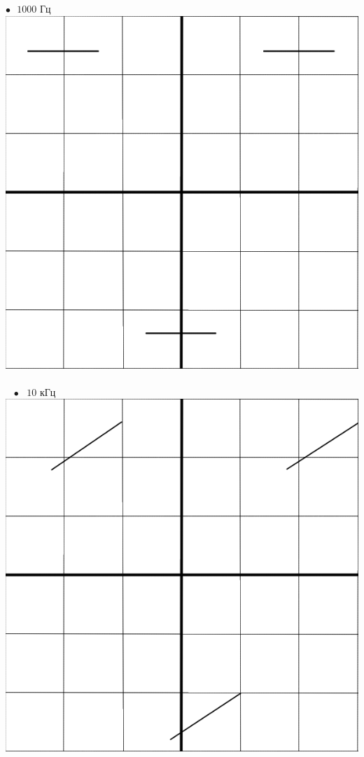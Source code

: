 \documentclass[a4paper,12pt]{article} %
\begin{document}
$\bullet\text{ } 1000\text{ Гц}$
\includegraphics[scale=0.28]{1000}\\\\
$\text{   }\bullet\text{ } 10\text{ кГц}\text{ }\text{ }\text{ }\text{ }$
\includegraphics[scale=0.28]{10000}
\end{document}
